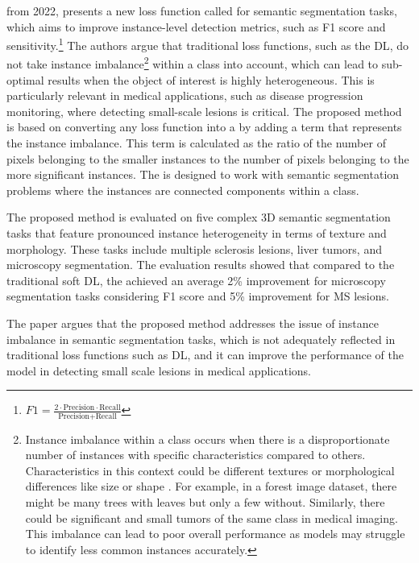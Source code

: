  \cite{https://doi.org/10.48550/arxiv.2205.08209} from 2022, presents a new loss function called  for semantic segmentation tasks, which aims to improve instance-level detection metrics, such as F1 score and sensitivity.\footnote{$F1=\frac{2\cdot \text{Precision}\cdot \text{Recall}}{\text{Precision}+\text{Recall}}$} The authors argue that traditional loss functions, such as the \ac{DL}, do not take instance imbalance\footnote{Instance imbalance within a class occurs when there is a disproportionate number of instances with specific characteristics compared to others. Characteristics in this context could be different textures or morphological differences like size or shape \cite{https://doi.org/10.48550/arxiv.2205.08209}. For example, in a forest image dataset, there might be many trees with leaves but only a few without. Similarly, there could be significant and small tumors of the same class in medical imaging. This imbalance can lead to poor overall performance as models may struggle to identify less common instances accurately.} within a class into account, which can lead to sub-optimal results when the object of interest is highly heterogeneous. This is particularly relevant in medical applications, such as disease progression monitoring, where detecting small-scale lesions is critical. The proposed method is based on converting any loss function into a  by adding a term that represents the instance imbalance. This term is calculated as the ratio of the number of pixels belonging to the smaller instances to the number of pixels belonging to the more significant instances. The  is designed to work with semantic segmentation problems where the instances are connected components within a class.

The proposed method is evaluated on five complex 3D semantic segmentation tasks that feature pronounced instance heterogeneity in terms of texture and morphology. These tasks include multiple sclerosis lesions, liver tumors, and microscopy segmentation. The evaluation results showed that compared to the traditional soft \ac{DL}, the  achieved an average 2\% improvement for microscopy segmentation tasks considering F1 score and 5\% improvement for MS lesions.

The paper argues that the proposed  method addresses the issue of instance imbalance in semantic segmentation tasks, which is not adequately reflected in traditional loss functions such as \ac{DL}, and it can improve the performance of the model in detecting small scale lesions in medical applications.

